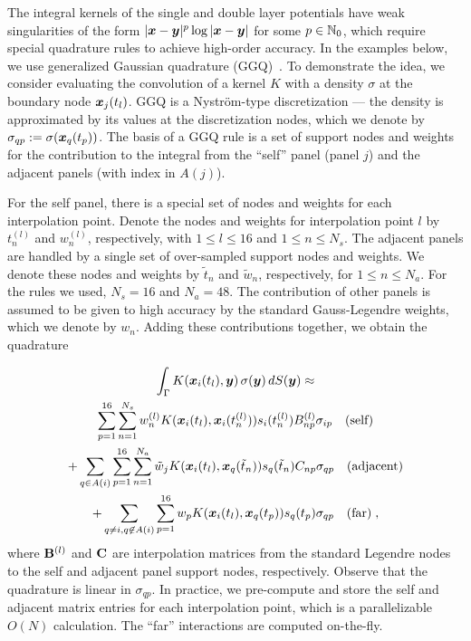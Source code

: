 The integral kernels of the single and
double layer potentials have weak
singularities of the form $|{\boldsymbol x}-{\boldsymbol y}|^p\log |{\boldsymbol x}-{\boldsymbol y}|$
for some $p \in \mathbb{N}_0$, which require special
quadrature rules to achieve high-order accuracy.
%
In the examples below, we use generalized
Gaussian quadrature (GGQ)~\cite{bremer2010}.
%
To demonstrate the idea, we consider
evaluating the convolution of a kernel
$K$ with a density $\sigma$
at the boundary node ${\boldsymbol x}_j(t_l)$.
%
GGQ is a Nystr\"{o}m-type discretization ---
the density is approximated 
by its values at the discretization nodes,
which we denote by
$\sigma_{qp} := \sigma({\boldsymbol x}_q(t_p))$.
%
The basis of a GGQ rule is a set of 
support nodes and weights for the
contribution to the integral from the
``self'' panel (panel $j$) and the adjacent
panels (with index in $A(j)$).
%

For the self panel, there is a special set
of nodes and weights for each interpolation
point. Denote the nodes and weights
for interpolation point $l$ by $t^{(l)}_{n}$
and $w^{(l)}_{n}$, respectively, with
$1\leq l \leq 16$ and $1\leq n \leq N_s$.
%
The adjacent panels are handled by a single
set of over-sampled support nodes and weights.
We denote these nodes and weights
by $\tilde{t}_n$ and $\tilde{w}_n$, respectively,
for $1 \leq n \leq N_a$.
%
For the rules we used, $N_s = 16$ and
$N_a = 48$.
%
The contribution of other panels is assumed
to be given to high accuracy by the standard
Gauss-Legendre weights, which we denote
by $w_n$.
%
Adding these contributions together, we obtain the
quadrature

\begin{multline}
  \int_\Gamma K({\boldsymbol x}_i(t_l),{\boldsymbol y}) \, \sigma({\boldsymbol y})
  \, dS({\boldsymbol y}) \approx \\
  \sum_{p=1}^{16} \sum_{n=1}^{N_s}
  w^{(l)}_{n} K({\boldsymbol x}_i(t_l),{\boldsymbol x}_i({t}^{(l)}_{n}))
  s_i({t}^{(l)}_{n}) B^{(l)}_{np} \sigma_{ip} \quad \textrm{(self)}
  \\
  + \sum_{q\in A(i)} \sum_{p=1}^{16} \sum_{n=1}^{N_a}
  \tilde{w}_jK({\boldsymbol x}_i(t_l),{\boldsymbol x}_q(\tilde{t}_n)) s_q(\tilde{t}_n)
  C_{np} \sigma_{qp}
  \quad \textrm{(adjacent)} \\
  + \sum_{q\neq i, q\not\in A(i)} \sum_{p=1}^{16}
  w_p K({\boldsymbol x}_i(t_l),{\boldsymbol x}_q(t_p)) s_q(t_p)
  \sigma_{qp} \quad \textrm{(far)} \nonumber \; ,
\end{multline}
where ${\bf B}^{(l)}$ and ${\bf C}$ are interpolation
matrices from the standard Legendre nodes
to the self and adjacent panel support nodes,
respectively. Observe that the quadrature is
linear in $\sigma_{qp}$. In practice, we pre-compute
and store the self and adjacent matrix entries for each
interpolation point, which is a parallelizable
$O(N)$ calculation. The ``far'' interactions
are computed on-the-fly.

